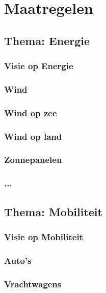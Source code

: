 \part{Maatregelen}

\chapter{Thema: Energie}
\section{Visie op Energie}
\section{Wind}
\section{Wind op zee}
\section{Wind op land}
\section{Zonnepanelen}
\section{...}



   


\chapter{Thema: Mobiliteit}
\section{Visie op Mobiliteit}
\section{Auto's}
\section{Vrachtwagens}

